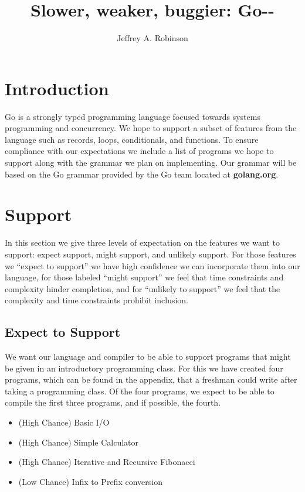 \documentclass{article}
\title{Slower, weaker, buggier: Go-{}-}
\date{}
\author{Jeffrey A. Robinson}
\begin{document}
\maketitle

\section{Introduction}

Go is a strongly typed programming language focused towards systems programming and concurrency.
We hope to support a subset of features from the language such as records, loops, conditionals, and functions.
To ensure compliance with our expectations we include a list of programs we hope to support along with the grammar we plan on implementing.  
Our grammar will be based on the Go grammar provided by the Go team located at {\bf golang.org}.   


\section{Support}

In this section we give three levels of expectation on the features we want to support: expect support, might support, and unlikely support.  For those features we 
``expect to support'' we have high confidence we can incorporate them into our language,
for those labeled ``might support'' we feel that time constraints and complexity hinder completion,
and for ``unlikely to support'' we feel that the complexity and time constraints prohibit inclusion.

\subsection{Expect to Support}

We want our language and compiler to be able to support programs that might be given in an introductory programming class.
For this we have created four programs, which can be found in the appendix, that a freshman could write after taking a programming class.  
Of the four programs, we expect to be able to compile the first three programs, and if possible, the fourth.

\begin{itemize}
    \item (High Chance) Basic I/O
    \item (High Chance) Simple Calculator
    \item (High Chance) Iterative and Recursive Fibonacci
    \item (Low Chance)  Infix to Prefix conversion
\end{itemize}
\end{document}
